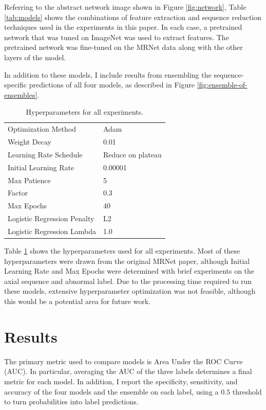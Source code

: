 \documentclass[10pt,twocolumn,letterpaper]{article}
\begin{document}
Referring to the abstract network image shown in Figure \ref{fig:network}, Table \ref{tab:models} shows the combinations of feature extraction and sequence reduction techniques used in the experiments in this paper. In each case, a pretrained network that was tuned on ImageNet was used to extract features. The pretrained network was fine-tuned on the MRNet data along with the other layers of the model.

In addition to these models, I include results from ensembling the sequence-specific predictions of all four models, as described in Figure \ref{fig:ensemble-of-ensembles}.

\begin{table}
\begin{center}
\begin{tabular}{|l|l|}
\hline
Optimization Method & Adam \\
Weight Decay & 0.01 \\
\hline
Learning Rate Schedule & Reduce on plateau \\
Initial Learning Rate & 0.00001 \\
Max Patience & 5 \\
Factor & 0.3 \\
\hline
Max Epochs & 40 \\
\hline
Logistic Regression Penalty & L2 \\
Logistic Regression Lambda & 1.0 \\
\hline

\end{tabular}
\end{center}
\caption{Hyperparameters for all experiments.}
\label{tab:hyperparams}
\end{table}

Table \ref{tab:hyperparams} shows the hyperparameters used for all experiments. Most of these hyperparameters were drawn from the original MRNet paper, although Initial Learning Rate and Max Epochs were determined with brief experiments on the axial sequence and abnormal label. Due to the processing time required to run these models, extensive hyperparameter optimization was not feasible, although this would be a potential area for future work.

\section{Results}
The primary metric used to compare models is Area Under the ROC Curve (AUC). In particular, averaging the AUC of the three labels determines a final metric for each model. In addition, I report the specificity, sensitivity, and accuracy of the four models and the ensemble on each label, using a $0.5$ threshold to turn probabilities into label predictions.
\end{document}
